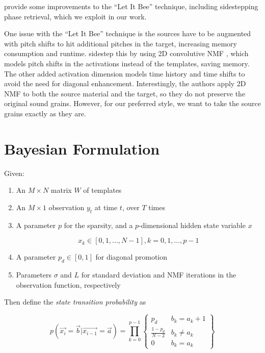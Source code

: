 \documentclass[letterpaper, 12pt]{article}
\begin{document}
\cite{buch2017nichtnegativematrixfaktorisierungnutzendesklangsynthesensystem} provide some improvements to the ``Let It Bee'' technique, including sidestepping phase retrieval, which we exploit in our work.

One issue with the ``Let It Bee'' technique is the sources have to be augmented with pitch shifts to hit additional pitches in the target, increasing memory consumption and runtime.  \cite{foroughmand2017multi, aarabi2018music} sidestep this by using 2D convolutive NMF \cite{schmidt2006nonnegative}, which models pitch shifts in the activations instead of the templates, saving memory.  The other added activation dimension models time history and time shifts to avoid the need for diagonal enhancement.  Interestingly, the authors apply 2D NMF to both the source material and the target, so they do not preserve the original sound grains.  However, for our preferred style, we want to take the source grains exactly as they are.


\section{Bayesian Formulation}

    Given:
    \begin{enumerate}
        \item
            An $M \times N$ matrix $W$ of templates
        
        \item
            An $M \times 1$ observation $y_t$ at time $t$, over $T$ times
        
        \item
            A parameter $p$ for the sparsity, and a $p$-dimensional hidden state variable $x$

                \[ x_k \in [0, 1, ..., N-1], k = 0, 1, ..., p-1 \]
        
        \item
            A parameter $p_d \in [0, 1]$ for diagonal promotion
        
        \item
            Parameters $\sigma$ and $L$ for standard deviation and NMF iterations in the observation function, respectively
        
    \end{enumerate}

        Then define the {\em state transition probability} as 

		\begin{equation}
        	p(\vec{x_i} = \vec{b} | \vec{x_{i-1}} = \vec{a}) = \prod_{k=0}^{p-1} \left\{  \begin{array}{cc}  p_d & b_k = a_k+1  \\ \frac{1-p_d}{N-2} & b_k \neq a_k \\ 0 & b_k = a_k \end{array} \right\}
		\end{equation}
\end{document}
